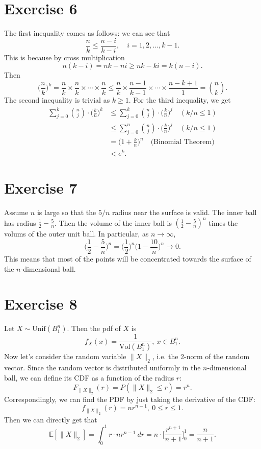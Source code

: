\section*{Exercise 6}
The first inequality comes as follows: we can see that 
\[ \frac{n}{k} \leq \frac{n - i}{k - i}, \quad i = 1, 2, \dots, k - 1. \]
This is because by cross multiplication
\[ n(k - i) = nk - ni \geq nk - ki = k(n - i). \]
Then
\[ \biggl( \frac{n}{k} \biggr)^k 
= \frac{n}{k} \times \frac{n}{k} \times \cdots \times \frac{n}{k} 
\leq \frac{n}{k} \times \frac{n - 1}{k - 1} \times \cdots \times \frac{n - k + 1}{1} 
= \binom{n}{k}. \]
The second inequality is trivial as $k \geq 1$.
For the third inequality, we get 
\begin{align*}
	\sum_{j = 0}^{k} \binom{n}{j} \cdot \biggl( \frac{k}{n} \biggr)^k 
	&\leq \sum_{j = 0}^{k} \binom{n}{j} \cdot \biggl( \frac{k}{n} \biggr)^j \quad (k/n \leq 1)\\
	&\leq \sum_{j = 0}^{n} \binom{n}{j} \cdot \biggl( \frac{k}{n} \biggr)^j \quad (k/n \leq 1)\\
	&= \biggl( 1 + \frac{k}{n} \biggr)^n \quad \text{(Binomial Theorem)} \\
	&< e^k.
\end{align*}


\newpage
\section*{Exercise 7}
Assume $n$ is large so that the $5/n$ radius near the surface is valid. The inner ball has radius 
$\frac{1}{2} - \frac{5}{n}$. Then the volume of the inner ball is $(\frac{1}{2} - \frac{5}{n})^n$ times 
the volums of the outer unit ball. In particular, as $n \to \infty$, 
\[ \biggl( \frac{1}{2} - \frac{5}{n} \biggr)^n 
= \biggl( \frac{1}{2} \biggr)^n \biggl( 1 - \frac{10}{n} \biggr)^n \to 0. \]
This means that most of the points will be concentrated towards the surface of the $n$-dimensional ball.


\newpage
\section*{Exercise 8}
Let $X \sim \text{Unif}(B_1^n)$. Then the pdf of $X$ is 
\[ f_X(x) = \frac{1}{\text{Vol}(B_1^n)}, \ x \in B_1^n. \]
Now let's consider the random variable $\|X\|_2$, i.e. the 2-norm of the random vector. Since 
the random vector is distributed uniformly in the $n$-dimensional ball, we can define its CDF as a 
function of the radius $r$: 
\[ F_{\|X\|_2}(r) = P(\|X\|_2 \leq r) = r^n. \]
Correspondingly, we can find the PDF by just taking the derivative of the CDF: 
\[ f_{\|X\|_2}(r) = nr^{n - 1}, \ 0 \leq r \leq 1. \]
Then we can directly get that 
\[ \mathbb{E}[\|X\|_2] = \int_{0}^{1} r \cdot nr^{n - 1} \ dr 
= n \cdot \biggl[ \frac{r^{n + 1}}{n + 1} \biggr]_0^1 = \frac{n}{n + 1}. \]


